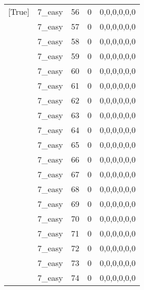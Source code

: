 \begin{tabular}{llrrl}
 [True]          & 7\_easy              &            56 &                     0 & 0,0,0,0,0,0   \\
 [True]          & 7\_easy              &            57 &                     0 & 0,0,0,0,0,0   \\
 [True]          & 7\_easy              &            58 &                     0 & 0,0,0,0,0,0   \\
 [True]          & 7\_easy              &            59 &                     0 & 0,0,0,0,0,0   \\
 [True]          & 7\_easy              &            60 &                     0 & 0,0,0,0,0,0   \\
 [True]          & 7\_easy              &            61 &                     0 & 0,0,0,0,0,0   \\
 [True]          & 7\_easy              &            62 &                     0 & 0,0,0,0,0,0   \\
 [True]          & 7\_easy              &            63 &                     0 & 0,0,0,0,0,0   \\
 [True]          & 7\_easy              &            64 &                     0 & 0,0,0,0,0,0   \\
 [True]          & 7\_easy              &            65 &                     0 & 0,0,0,0,0,0   \\
 [True]          & 7\_easy              &            66 &                     0 & 0,0,0,0,0,0   \\
 [True]          & 7\_easy              &            67 &                     0 & 0,0,0,0,0,0   \\
 [True]          & 7\_easy              &            68 &                     0 & 0,0,0,0,0,0   \\
 [True]          & 7\_easy              &            69 &                     0 & 0,0,0,0,0,0   \\
 [True]          & 7\_easy              &            70 &                     0 & 0,0,0,0,0,0   \\
 [True]          & 7\_easy              &            71 &                     0 & 0,0,0,0,0,0   \\
 [True]          & 7\_easy              &            72 &                     0 & 0,0,0,0,0,0   \\
 [True]          & 7\_easy              &            73 &                     0 & 0,0,0,0,0,0   \\
 [True]          & 7\_easy              &            74 &                     0 & 0,0,0,0,0,0   \\

\end{tabular}
